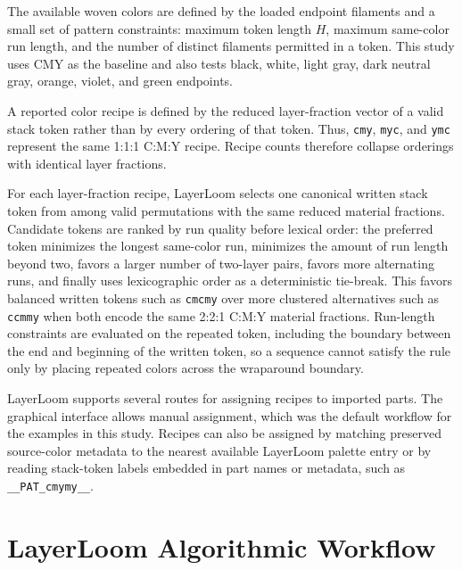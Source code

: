 \documentclass[5p,times,numbers]{elsarticle}
\begin{document}
The available woven colors are defined by the loaded endpoint filaments and a small set of pattern constraints: maximum token length \(H\), maximum same-color run length, and the number of distinct filaments permitted in a token. This study uses CMY as the baseline and also tests black, white, light gray, dark neutral gray, orange, violet, and green endpoints.

A reported color recipe is defined by the reduced layer-fraction vector of a valid stack token rather than by every ordering of that token. Thus, \texttt{cmy}, \texttt{myc}, and \texttt{ymc} represent the same 1:1:1 C:M:Y recipe. Recipe counts therefore collapse orderings with identical layer fractions.

For each layer-fraction recipe, LayerLoom selects one canonical written stack token from among valid permutations with the same reduced material fractions. Candidate tokens are ranked by run quality before lexical order: the preferred token minimizes the longest same-color run, minimizes the amount of run length beyond two, favors a larger number of two-layer pairs, favors more alternating runs, and finally uses lexicographic order as a deterministic tie-break. This favors balanced written tokens such as \texttt{cmcmy} over more clustered alternatives such as \texttt{ccmmy} when both encode the same 2:2:1 C:M:Y material fractions. Run-length constraints are evaluated on the repeated token, including the boundary between the end and beginning of the written token, so a sequence cannot satisfy the rule only by placing repeated colors across the wraparound boundary.

LayerLoom supports several routes for assigning recipes to imported parts. The graphical interface allows manual assignment, which was the default workflow for the examples in this study. Recipes can also be assigned by matching preserved source-color metadata to the nearest available LayerLoom palette entry or by reading stack-token labels embedded in part names or metadata, such as \texttt{\_\_PAT\_cmymy\_\_}.


\section{LayerLoom Algorithmic Workflow}
\end{document}
